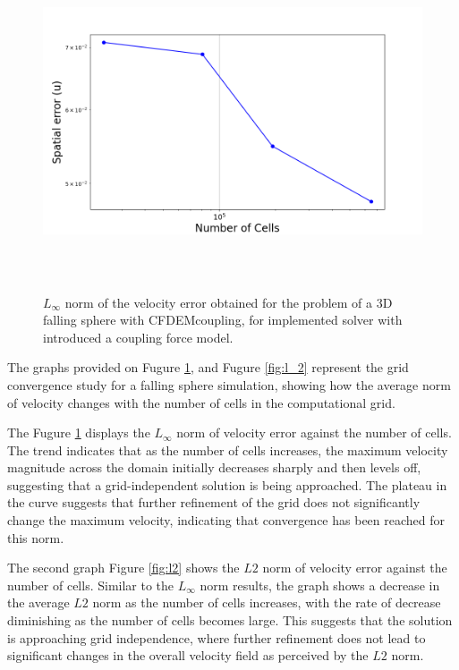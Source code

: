 \begin{figure}[!ht]
    \centering
    \includegraphics[width=16cm, height = 10cm]{ GWU_Thesis_Sarmakeeva/Images/chap3/l_inf.png }
    \caption{$L_{\infty}$ norm of the velocity error obtained for the problem of a 3D falling sphere with CFDEMcoupling, for implemented solver with introduced a coupling force model.}
    \label{fig:l_inf}
\end{figure}

The graphs provided on Fugure \ref{fig:l_inf}, and Fugure \ref{fig:l_2} represent the grid convergence study for a falling sphere simulation, showing how the average norm of velocity changes with the number of cells in the computational grid. 

The Fugure \ref{fig:l_inf} displays the $L_{\infty}$ norm of velocity error against the number of cells. The trend indicates that as the number of cells increases, the maximum velocity magnitude across the domain initially decreases sharply and then levels off, suggesting that a grid-independent solution is being approached. The plateau in the curve suggests that further refinement of the grid does not significantly change the maximum velocity, indicating that convergence has been reached for this norm.

The second graph Figure \ref{fig:l2} shows the $L2$ norm of velocity error against the number of cells. Similar to the $L_{\infty}$ norm results, the graph shows a decrease in the average $L2$ norm as the number of cells increases, with the rate of decrease diminishing as the number of cells becomes large. This suggests that the solution is approaching grid independence, where further refinement does not lead to significant changes in the overall velocity field as perceived by the $L2$ norm.



